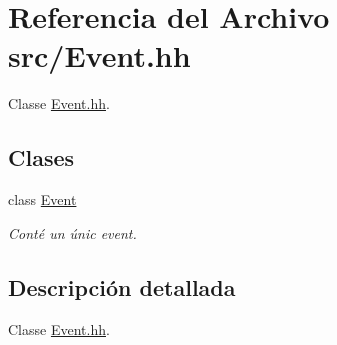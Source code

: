 \hypertarget{_event_8hh}{}\section{Referencia del Archivo src/\+Event.hh}
\label{_event_8hh}


Classe \hyperlink{_event_8hh}{Event.\+hh}.  


\subsection*{Clases}
\begin{DoxyCompactItemize}
\item 
class \hyperlink{class_event}{Event}
\begin{DoxyCompactList}\small\item\em Conté un únic event. \end{DoxyCompactList}\end{DoxyCompactItemize}


\subsection{Descripción detallada}
Classe \hyperlink{_event_8hh}{Event.\+hh}. 

